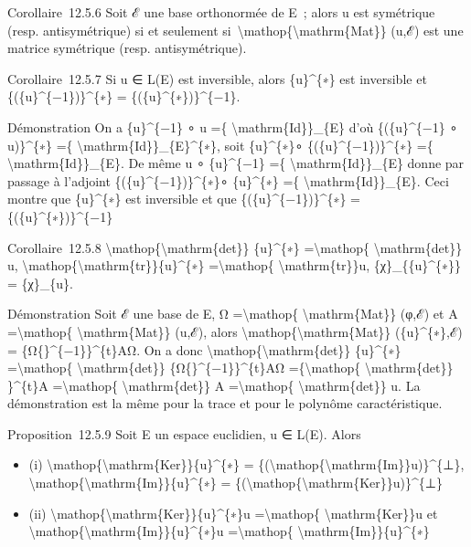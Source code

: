 \documentclass[]{article}
\begin{document}
Corollaire~12.5.6 Soit ℰ une base orthonormée de E~; alors u est
symétrique (resp. antisymétrique) si et seulement
si~\textbackslash{}mathop\{\textbackslash{}mathrm\{Mat\}\} (u,ℰ) est une
matrice symétrique (resp. antisymétrique).

Corollaire~12.5.7 Si u ∈ L(E) est inversible, alors \{u\}\^{}\{∗\} est
inversible et \{(\{u\}\^{}\{−1\})\}\^{}\{∗\} =
\{(\{u\}\^{}\{∗\})\}\^{}\{−1\}.

Démonstration On a \{u\}\^{}\{−1\} ∘ u =\{
\textbackslash{}mathrm\{Id\}\}\_\{E\} d'où \{(\{u\}\^{}\{−1\} ∘
u)\}\^{}\{∗\} =\{ \textbackslash{}mathrm\{Id\}\}\_\{E\}\^{}\{∗\}, soit
\{u\}\^{}\{∗\}∘ \{(\{u\}\^{}\{−1\})\}\^{}\{∗\} =\{
\textbackslash{}mathrm\{Id\}\}\_\{E\}. De même u ∘ \{u\}\^{}\{−1\} =\{
\textbackslash{}mathrm\{Id\}\}\_\{E\} donne par passage à l'adjoint
\{(\{u\}\^{}\{−1\})\}\^{}\{∗\}∘ \{u\}\^{}\{∗\} =\{
\textbackslash{}mathrm\{Id\}\}\_\{E\}. Ceci montre que \{u\}\^{}\{∗\}
est inversible et que \{(\{u\}\^{}\{−1\})\}\^{}\{∗\} =
\{(\{u\}\^{}\{∗\})\}\^{}\{−1\}

Corollaire~12.5.8
\textbackslash{}mathop\{\textbackslash{}mathrm\{det\}\} \{u\}\^{}\{∗\}
=\textbackslash{}mathop\{ \textbackslash{}mathrm\{det\}\} u,
\textbackslash{}mathop\{\textbackslash{}mathrm\{tr\}\}\{u\}\^{}\{∗\}
=\textbackslash{}mathop\{ \textbackslash{}mathrm\{tr\}\}u,
\{χ\}\_\{\{u\}\^{}\{∗\}\} = \{χ\}\_\{u\}.

Démonstration Soit ℰ une base de E, Ω =\textbackslash{}mathop\{
\textbackslash{}mathrm\{Mat\}\} (φ,ℰ) et A =\textbackslash{}mathop\{
\textbackslash{}mathrm\{Mat\}\} (u,ℰ), alors
\textbackslash{}mathop\{\textbackslash{}mathrm\{Mat\}\}
(\{u\}\^{}\{∗\},ℰ) = \{Ω\{\}\^{}\{−1\}\}\^{}\{t\}AΩ. On a donc
\textbackslash{}mathop\{\textbackslash{}mathrm\{det\}\} \{u\}\^{}\{∗\}
=\textbackslash{}mathop\{ \textbackslash{}mathrm\{det\}\}
\{Ω\{\}\^{}\{−1\}\}\^{}\{t\}AΩ =\{\textbackslash{}mathop\{
\textbackslash{}mathrm\{det\}\} \}\^{}\{t\}A =\textbackslash{}mathop\{
\textbackslash{}mathrm\{det\}\} A =\textbackslash{}mathop\{
\textbackslash{}mathrm\{det\}\} u. La démonstration est la même pour la
trace et pour le polynôme caractéristique.

Proposition~12.5.9 Soit E un espace euclidien, u ∈ L(E). Alors

\begin{itemize}
\itemsep1pt\parskip0pt
\item
  (i)
  \textbackslash{}mathop\{\textbackslash{}mathrm\{Ker\}\}\{u\}\^{}\{∗\}
  =
  \{(\textbackslash{}mathop\{\textbackslash{}mathrm\{Im\}\}u)\}\^{}\{⊥\},
  \textbackslash{}mathop\{\textbackslash{}mathrm\{Im\}\}\{u\}\^{}\{∗\} =
  \{(\textbackslash{}mathop\{\textbackslash{}mathrm\{Ker\}\}u)\}\^{}\{⊥\}
\item
  (ii)
  \textbackslash{}mathop\{\textbackslash{}mathrm\{Ker\}\}\{u\}\^{}\{∗\}u
  =\textbackslash{}mathop\{ \textbackslash{}mathrm\{Ker\}\}u et
  \textbackslash{}mathop\{\textbackslash{}mathrm\{Im\}\}\{u\}\^{}\{∗\}u
  =\textbackslash{}mathop\{ \textbackslash{}mathrm\{Im\}\}\{u\}\^{}\{∗\}
\end{itemize}
\end{document}
